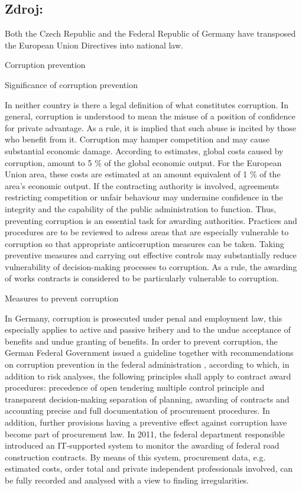 \documentclass[10pt]{article}
\begin{document}
\subsection*{Zdroj:}

Both the Czech Republic and the Federal Republic of Germany have transposed the European Union Directives into national law.


Corruption prevention



Significance of corruption prevention

In neither country is there a legal definition of what constitutes corruption.
In general, corruption is understood to mean the misuse of a position of confidence for private advantage.
As a rule, it is implied that such abuse is incited by those who benefit from it.
Corruption may hamper competition and may cause substantial economic damage.
According to estimates, global costs caused by corruption, amount to 5 \% of the global economic output.
For the European Union area, these costs are estimated at an amount equivalent of 1 \% of the area’s economic output.
If the contracting authority is involved, agreements restricting competition or unfair behaviour may undermine confidence in the integrity and the capability of the public administration to function.
Thus, preventing corruption is an essential task for awarding authorities.
Practices and procedures are to be reviewed to adress areas that are especially vulnerable to corruption so that appropriate anticorruption measures can be taken.
Taking preventive measures and carrying out effective controls may substantially reduce vulnerability of decision-making processes to corruption.
As a rule, the awarding of works contracts is considered to be particularly vulnerable to corruption.


Measures to prevent corruption

In Germany, corruption is prosecuted under penal and employment law, this especially applies to active and passive bribery and to the undue acceptance of benefits and undue granting of benefits.
In order to prevent corruption, the German Federal Government issued a guideline together with recommendations on corruption prevention in the federal administration , according to which, in addition to risk analyses, the following principles shall apply to contract award procedures: precedence of open tendering multiple control principle and transparent decision-making separation of planning, awarding of contracts and accounting precise and full documentation of procurement procedures.
In addition, further provisions having a preventive effect against corruption have become part of procurement law.
In 2011, the federal department responsible introduced an IT-supported system to monitor the awarding of federal road construction contracts.
By means of this system, procurement data, e.g. estimated costs, order total and private independent professionals involved, can be fully recorded and analysed with a view to finding irregularities.
\end{document}
